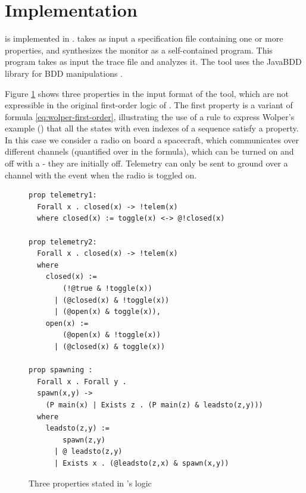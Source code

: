 
\section{Implementation}

\dejavu{} is implemented in \scalalang{}.   
\dejavu{} takes as input a specification file containing one  or 
more  properties, and synthesizes the monitor as a self-contained \scalalang{} 
program.
This program takes as input the 
trace file and analyzes it.
The tool uses the JavaBDD library for BDD manipulations \cite{javabdd}.

%
Figure \ref{fig:properties} shows three properties in the 
input format of the tool, which are not expressible in the original first-order logic of \dejavu{}. The first property  is a variant of
formula \ref{eq:wolper-first-order}, illustrating the use of a 
rule to express Wolper's example (\cite{Wolper}) that all the states with even indexes of a sequence satisfy a property.
In this case we consider a radio on board a spacecraft, which communicates over different channels (quantified over in the formula), which can be turned on and off with a  - they are initially off.
Telemetry can only be sent to ground over a channel  with the  event when the radio is toggled on.

\begin{center}
\begin{figure}
\begin{lstlisting}[language=dsl,frame=single,linewidth=0.95\textwidth,backgroundcolor=\color{white},linewidth=\columnwidth,breaklines=true,basicstyle=\small]
prop telemetry1: 
  Forall x . closed(x) -> !telem(x)
  where closed(x) := toggle(x) <-> @!closed(x)

prop telemetry2: 
  Forall x . closed(x) -> !telem(x)
  where
    closed(x) :=
        (!@true & !toggle(x))
      | (@closed(x) & !toggle(x))
      | (@open(x) & toggle(x)),
    open(x) :=
        (@open(x) & !toggle(x))
      | (@closed(x) & toggle(x))

prop spawning : 
  Forall x . Forall y .
  spawn(x,y) -> 
    (P main(x) | Exists z . (P main(z) & leadsto(z,y)))
  where
    leadsto(z,y) := 
        spawn(z,y) 
      | @ leadsto(z,y) 
      | Exists x . (@leadsto(z,x) & spawn(x,y))
\end{lstlisting}
\caption{Three properties stated in \dejavu's logic}
\label{fig:properties}
\end{figure}
\end{center}

